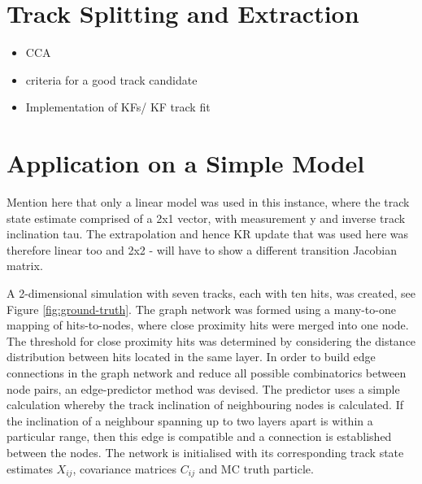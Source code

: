 \section{Track Splitting and Extraction}
\begin{itemize}
    \item CCA
    \item criteria for a good track candidate
    \item Implementation of KFs/ KF track fit
\end{itemize}




\section{Application on a Simple Model}
\label{gnn-application-toy-model}

Mention here that only a linear model was used in this instance, where the track state estimate comprised of a 2x1 vector, with measurement y and inverse track inclination tau. The extrapolation and hence KR update that was used here was therefore linear too and 2x2 - will have to show a different transition Jacobian matrix.





A 2-dimensional simulation with seven tracks, each with ten hits, was created, see Figure \ref{fig:ground-truth}. The graph network was formed using a many-to-one mapping of hits-to-nodes, where close proximity hits were merged into one node. The threshold for close proximity hits was determined by considering the distance distribution between hits located in the same layer. In order to build edge connections in the graph network and reduce all possible combinatorics between node pairs, an edge-predictor method was devised. The predictor uses a simple calculation whereby the track inclination of neighbouring nodes is calculated. If the inclination of a neighbour spanning up to two layers apart is within a particular range, then this edge is compatible and a connection is established between the nodes. The network is initialised with its corresponding track state estimates $X_{ij}$, covariance matrices $C_{ij}$ and MC truth particle.

